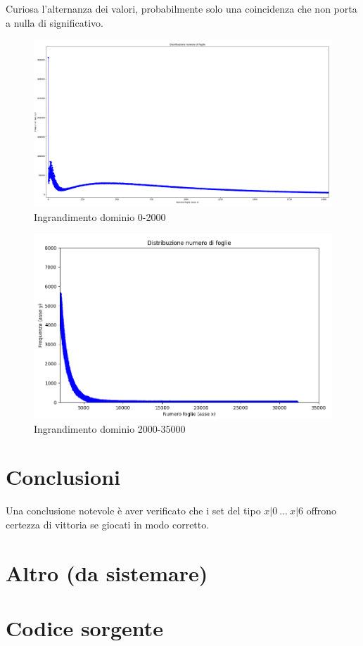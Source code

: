 \documentclass[a4paper,12pt]{report}
\begin{document}
Curiosa l'alternanza dei valori, probabilmente solo una coincidenza che non porta a nulla di significativo.

\begin{figure}[h!]
    \centering
    \includegraphics[width=1\textwidth]{imgs/grafico_0_2000.png} 
    \caption{Ingrandimento dominio 0-2000}
    \label{fig:etichetta}
\end{figure}

\begin{figure}[h!]
    \centering
    \includegraphics[width=1\textwidth]{imgs/grafico_2000_35000.png} 
    \caption{Ingrandimento dominio 2000-35000}
    \label{fig:etichetta}
\end{figure}




\chapter{Conclusioni}

Una conclusione notevole è aver verificato che i set del tipo \(x|0\ ...\ x|6\) offrono certezza di vittoria se giocati in modo corretto.

\chapter{Altro (da sistemare)}





\appendix
\chapter{Codice sorgente}

\end{document}
